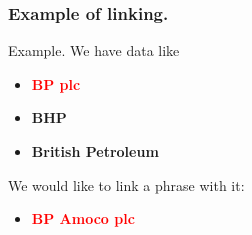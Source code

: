 \documentclass{beamer}
\begin{document}
\begin{frame}
\frametitle{Example of linking.}
\begin{block}{Example.}
We have data like
 
 \begin{itemize}
	 \item \textcolor{red}{\textbf{BP plc}}
	 \item \textbf{BHP}
	 \item \textbf{British Petroleum}
 \end{itemize}

We would like to link a phrase with it:

\begin{itemize}
\item \textcolor{red}{\textbf{BP Amoco plc}}
\end{itemize}
\end{block}
\end{frame}
\end{document}
